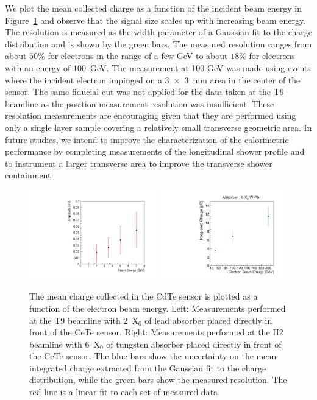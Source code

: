We plot the mean collected charge as a function of the incident beam energy
in Figure~\ref{fig:ChargeVsEnergy} and observe that the signal size scales
up with increasing beam energy. The resolution is measured as the width
parameter of a Gaussian fit to the charge distribution and is shown by the green bars. 
The measured resolution ranges from
about $50\%$ for electrons in the range of a few GeV to 
about $18\%$ for electrons with an energy of $100$~GeV.
The measurement at 100 GeV was made using events where the incident electron impinged on
a 3~$\times$~3~mm area in the center of the sensor. The same fiducial cut was not applied
for the data taken at the T9 beamline as the position measurement resolution was insufficient.
These resolution measurements are encouraging given that they are performed
using only a single layer sample covering a relatively small transverse
geometric area. In future studies, we intend to improve the characterization
of the calorimetric performance by completing measurements of the
longitudinal shower profile and to instrument a larger transverse 
area to improve the transverse shower containment. 

\begin{figure}[htbp] 
\centering
\includegraphics[width=0.49\textwidth]{figures/T9AmpMPlot.pdf} 
\includegraphics[width=0.49\textwidth]{figures/ChargeVsEnergyAt6X0.pdf} 
\caption{ The mean charge collected in the CdTe sensor is plotted as a function
of the electron beam energy. Left: Measurements performed at the T9 beamline
with $2$~$\mathrm{X}_{0}$ of lead absorber placed directly in front of the 
CeTe sensor. Right: Measurements performed at the H2 beamline
with $6$~$\mathrm{X}_{0}$ of tungsten absorber placed directly in front of the 
CeTe sensor. The blue bars show the uncertainty on the mean integrated charge
extracted from the Gaussian fit to the charge distribution, while the green 
bars show the measured resolution. The red line is a 
linear fit to each set of measured data. } 
\label{fig:ChargeVsEnergy} 
\end{figure} 


